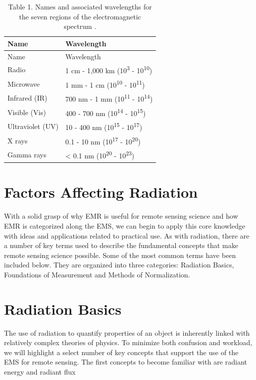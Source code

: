 \documentclass[
]{book}
\begin{document}
\begin{longtable}[]{@{}ll@{}}
\caption{Table 1. Names and associated wavelengths for the seven regions of the electromagnetic spectrum \citep{zwinkels_encyclopedia_2020}.}\tabularnewline
\toprule\noalign{}
Name & Wavelength \\
\midrule\noalign{}
\endfirsthead
\toprule\noalign{}
Name & Wavelength \\
\midrule\noalign{}
\endhead
\bottomrule\noalign{}
\endlastfoot
Radio & 1 cm - 1,000 km (10\textsuperscript{3} - 10\textsuperscript{10}) \\
Microwave & 1 mm - 1 cm (10\textsuperscript{10} - 10\textsuperscript{11}) \\
Infrared (IR) & 700 nm - 1 mm (10\textsuperscript{11} - 10\textsuperscript{14}) \\
Visible (Vis) & 400 - 700 nm (10\textsuperscript{14} - 10\textsuperscript{15}) \\
Ultraviolet (UV) & 10 - 400 nm (10\textsuperscript{15} - 10\textsuperscript{17}) \\
X rays & 0.1 - 10 nm (10\textsuperscript{17} - 10\textsuperscript{20}) \\
Gamma rays & \textless{} 0.1 nm (10\textsuperscript{20} - 10\textsuperscript{23}) \\
\end{longtable}

\section{Factors Affecting Radiation}\label{factors-affecting-radiation}

With a solid grasp of why EMR is useful for remote sensing science and how EMR is categorized along the EMS, we can begin to apply this core knowledge with ideas and applications related to practical use. As with radiation, there are a number of key terms used to describe the fundamental concepts that make remote sensing science possible. Some of the most common terms have been included below. They are organized into three categories: Radiation Basics, Foundations of Measurement and Methods of Normalization.

\section{Radiation Basics}\label{radiation-basics}

The use of radiation to quantify properties of an object is inherently linked with relatively complex theories of physics. To minimize both confusion and workload, we will highlight a select number of key concepts that support the use of the EMS for remote sensing. The first concepts to become familiar with are radiant energy and radiant flux
\end{document}
